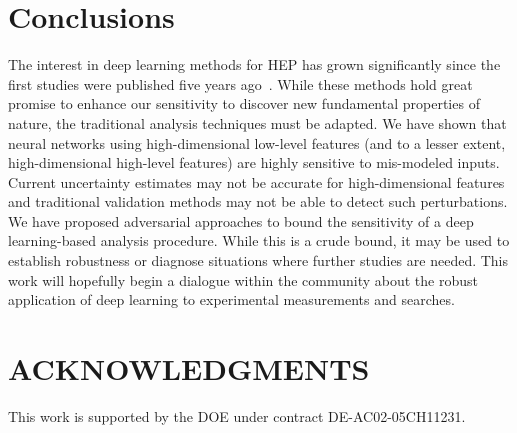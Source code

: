 \documentclass[reprint,nofootinbib,...]{revtex4-1}
\begin{document}
\clearpage

\section{Conclusions}

The interest in deep learning methods for HEP has grown significantly since the first studies were published five years ago~\cite{Baldi:2014kfa}.  While these methods hold great promise to enhance our sensitivity to discover new fundamental properties of nature, the traditional analysis techniques must be adapted.  We have shown that neural networks using high-dimensional low-level features (and to a lesser extent, high-dimensional high-level features) are highly sensitive to mis-modeled inputs.  Current uncertainty estimates may not be accurate for high-dimensional features and traditional validation methods may not be able to detect such perturbations.  We have proposed adversarial approaches to bound the sensitivity of a deep learning-based analysis procedure.  While this is a crude bound, it may be used to establish robustness or diagnose situations where further studies are needed.  This work will hopefully begin a dialogue within the community about the robust application of deep learning to experimental measurements and searches.

\section*{ACKNOWLEDGMENTS}

This work is supported by the DOE under contract DE-AC02-05CH11231. 


\end{document}
